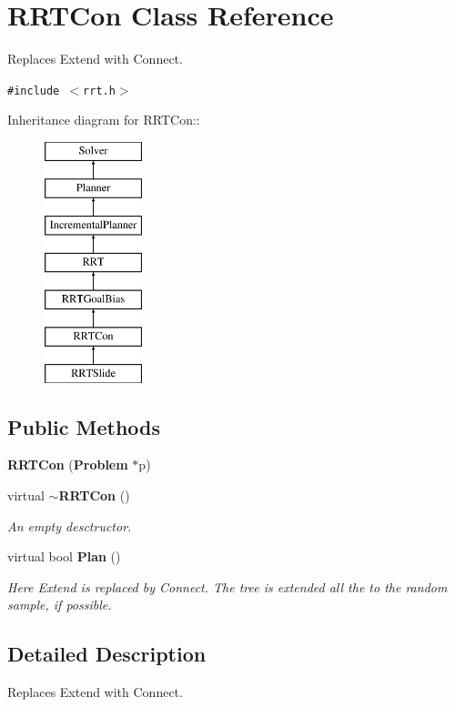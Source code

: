 \section{RRTCon  Class Reference}
\label{class_RRTCon}
Replaces Extend with Connect. 


{\tt \#include $<$rrt.h$>$}

Inheritance diagram for RRTCon::\begin{figure}[H]
\begin{center}
\leavevmode
\includegraphics[height=7cm]{class_RRTCon}
\end{center}
\end{figure}
\subsection*{Public Methods}
\begin{CompactItemize}
\item 
{\bf RRTCon} ({\bf Problem} $\ast$p)
\item 
virtual {\bf $\sim$RRTCon} ()
\begin{CompactList}\small\item\em An empty desctructor.\item\end{CompactList}\item 
virtual bool {\bf Plan} ()
\begin{CompactList}\small\item\em Here Extend is replaced by Connect. The tree is extended all the to the random sample, if possible.\item\end{CompactList}\end{CompactItemize}


\subsection{Detailed Description}
Replaces Extend with Connect.

